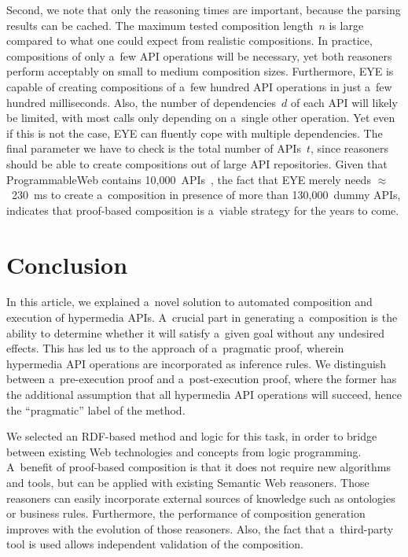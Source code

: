 Second, we note that only the reasoning times are important,
because the parsing results can be cached.
The maximum tested composition length~$n$ is large compared to
what one could expect from realistic compositions.
In practice, compositions of only a~few API operations will be necessary,
yet both reasoners perform acceptably on small to medium composition sizes.
Furthermore, EYE is capable of creating compositions of a~few hundred API operations
in just a~few hundred milliseconds.
Also, the number of dependencies~$d$ of each API will likely be limited,
with most calls only depending on a~single other operation.
Yet even if this is not the case,
EYE can fluently cope with multiple dependencies.
The final parameter we have to check is the total number of APIs~$t$,
since reasoners should be able to create compositions out of large API repositories.
Given that ProgrammableWeb contains 10,000~APIs~\cite{ProgrammableWeb},
the fact that EYE merely needs $\approx$~230~ms
to create a~composition in presence of more than 130,000~dummy APIs,
indicates that proof-based composition is a~viable strategy for the years to come.

\section{Conclusion}
\label{sec:Conclusion}
In this article,
we explained a~novel solution to automated composition and execution of hypermedia APIs.
A~crucial part in generating a~composition
is the ability to determine whether it will satisfy a~given goal
without any undesired effects.
This has led us to the approach of a~pragmatic proof,
wherein hypermedia API operations are incorporated as inference rules.
We distinguish between a~pre-execution proof and a~post-execution proof,
where the former has the additional assumption that all hypermedia API operations will succeed,
hence the ``pragmatic'' label of the method.

We selected an RDF-based method and logic for this task,
in order to bridge between existing Web technologies
and concepts from logic programming.
A~benefit of proof-based composition is that it does not require new algorithms and tools,
but can be applied with existing Semantic Web reasoners.
Those reasoners can easily incorporate external sources of knowledge
such as ontologies or business rules.
Furthermore, the performance of composition generation improves
with the evolution of those reasoners.
Also, the fact that a~third-party tool is used allows independent validation of the composition.

